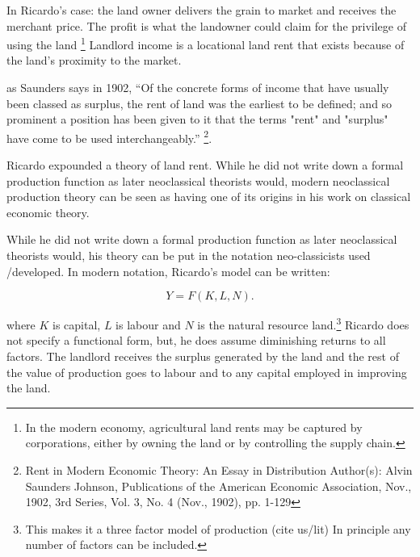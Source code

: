 In Ricardo's case: the land owner delivers the grain to market and receives the merchant price. The profit is what the landowner could claim for the privilege of using the land %
\footnote{In the modern economy, agricultural land rents may be captured by corporations,  either by owning the land or by controlling the supply chain.}  Landlord income is a locational land rent that exists because of the land's proximity to the market. 
 

as Saunders says in 1902, ``Of the concrete forms of income that have usually been classed as surplus, the rent of land was the earliest to be defined; and so prominent a position has been given to it that the terms "rent" and "surplus" have come to be used interchangeably.'' \footnote{Rent in Modern Economic Theory: An Essay in Distribution Author(s): Alvin Saunders Johnson, Publications of the American Economic Association, Nov., 1902, 3rd Series, Vol. 3, No. 4 (Nov., 1902), pp. 1-129}. 

Ricardo expounded a theory of land rent. While he did not write down a formal production function as later neoclassical theorists would, modern neoclassical production theory can be seen as having one of its origins in his work on classical economic theory. %

While he did not write down a formal production function as later neoclassical theorists would, his theory can be put in the notation neo-classicists used /developed. In modern notation, Ricardo's model can be written: 

\begin{equation} 
Y=F(K,L,N).
\label{eqn-production-ricardo}
\end{equation} 

where $K$ is capital, $L$ is labour and $N$  is the natural resource land.\footnote{This makes it a three factor model of production (cite us/lit) In principle any number of factors can be included.}  
Ricardo does not specify a functional form, but, %
he does assume diminishing returns to all factors. The landlord  receives the surplus generated by the land and the rest of the value of production goes to labour and to any capital employed in improving the land. 

